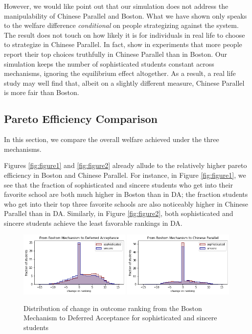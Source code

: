 \documentclass[10pt, reqno]{amsart}
\begin{document}
However, we would like point out that our simulation does not address the manipulability of Chinese Parallel and Boston. What we have shown only speaks to the welfare difference \textit{conditional} on people strategizing against the system. The result does not touch on how likely it is for individuals in real life to choose to strategize in Chinese Parallel. In fact, \cite{chen2013boston} show in experiments that more people report their top choices truthfully in Chinese Parallel than in Boston. Our simulation keeps the number of sophisticated students constant across mechanisms, ignoring the equilibrium effect altogether. As a result, a real life study may well find that, albeit on a slightly different measure, Chinese Parallel is more fair than Boston. 


\subsection{Pareto Efficiency Comparison}
In this section, we compare the overall welfare achieved under the three mechanisms.

Figures \ref{fig:figure1} and \ref{fig:figure2} already allude to the relatively higher pareto efficiency in Boston and Chinese Parallel. For instance, in Figure \ref{fig:figure1}, we see that the fraction of sophisticated and sincere students who get into their favorite school are both much higher in Boston than in DA; the fraction students who get into their top three favorite schools are also noticeably higher in Chinese Parallel than in DA. Similarly, in Figure \ref{fig:figure2}, both sophisticated and sincere students achieve the least favorable rankings in DA. 

\begin{figure}[h]
  \centering
  \includegraphics[width=0.49\textwidth]{../figures/BM2DA_rank_change_hist_p2.png}
  \includegraphics[width=0.49\textwidth]{../figures/BM2CP_rank_change_hist_p2.png}
  \caption{Distribution of change in outcome ranking from the Boston Mechanism to Deferred Acceptance for sophisticated and sincere students}
  \label{fig:figure3}
\end{figure}
\end{document}
